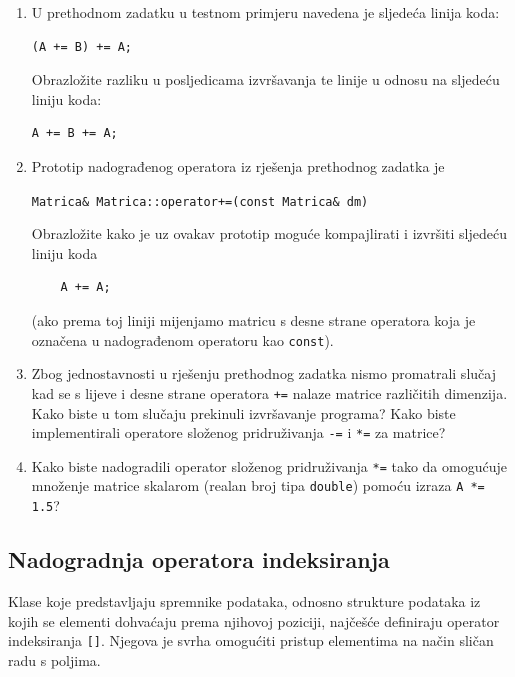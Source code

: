 \begin{razmisljanje}
    \begin{enumerate}
        \item 
        U prethodnom zadatku u testnom primjeru navedena je sljedeća linija koda:
\begin{verbatim}
(A += B) += A;
\end{verbatim}
    Obrazložite razliku u posljedicama izvršavanja te linije u odnosu na sljedeću liniju koda:
\begin{verbatim}
A += B += A;
\end{verbatim}

    \item 
    Prototip nadograđenog operatora iz rješenja prethodnog zadatka je
    \begin{center}
        \texttt{Matrica\& Matrica::operator+=(const Matrica\& dm)}
    \end{center}
    Obrazložite kako je uz ovakav prototip moguće kompajlirati i izvršiti sljedeću liniju koda
    \begin{verbatim}
    A += A;
    \end{verbatim}
    (ako prema toj liniji mijenjamo matricu s desne strane operatora koja je označena u nadograđenom operatoru kao \texttt{const}).

    \item 
    Zbog jednostavnosti u rješenju prethodnog zadatka nismo promatrali slučaj kad se s lijeve i desne strane operatora \texttt{+=}
    nalaze matrice različitih dimenzija.
    Kako biste u tom slučaju prekinuli izvršavanje programa?
    Kako biste implementirali operatore složenog pridruživanja \texttt{-=} i \texttt{*=}
    za matrice?

    \item 
    Kako biste nadogradili operator složenog pridruživanja \texttt{*=} tako da 
    omogućuje množenje matrice skalarom
    (realan broj tipa \texttt{double})
    pomoću izraza \texttt{A *= 1.5}?
    \end{enumerate}
\end{razmisljanje}



\subsection{Nadogradnja operatora indeksiranja}


Klase koje predstavljaju spremnike podataka, odnosno strukture podataka iz kojih se elementi dohvaćaju prema njihovoj poziciji, 
najčešće definiraju operator indeksiranja \texttt{[]}. 
Njegova je svrha omogućiti pristup elementima na način sličan radu s poljima.
\medskip

